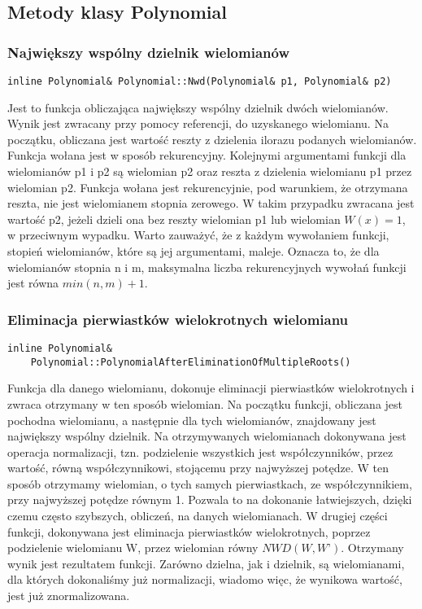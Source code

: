 \documentclass[twoside,a4paper]{book}
\begin{document}
\subsection{Metody klasy Polynomial}

\subsubsection{Największy wspólny dzielnik wielomianów}
\begin{lstlisting}
inline Polynomial& Polynomial::Nwd(Polynomial& p1, Polynomial& p2)
\end{lstlisting}
Jest to funkcja obliczająca największy wspólny dzielnik dwóch wielomianów. Wynik jest zwracany przy pomocy referencji, do uzyskanego wielomianu. Na początku, obliczana jest wartość reszty z dzielenia ilorazu podanych wielomianów. Funkcja wołana jest w sposób rekurencyjny. Kolejnymi argumentami funkcji dla wielomianów p1 i p2 są wielomian p2 oraz reszta z dzielenia wielomianu p1 przez wielomian p2. Funkcja wołana jest rekurencyjnie, pod warunkiem, że otrzymana reszta, nie jest wielomianem stopnia zerowego. W takim przypadku zwracana jest wartość p2, jeżeli dzieli ona bez reszty wielomian p1 lub wielomian $W(x)=1$, w przeciwnym wypadku. Warto zauważyć, że z każdym wywołaniem funkcji, stopień wielomianów, które są jej argumentami, maleje. Oznacza to, że dla wielomianów stopnia n i m, maksymalna liczba rekurencyjnych wywołań funkcji jest równa $min(n,m)+1$.

\subsubsection{Eliminacja pierwiastków wielokrotnych wielomianu}
\begin{lstlisting}
inline Polynomial&
	Polynomial::PolynomialAfterEliminationOfMultipleRoots()
\end{lstlisting}
Funkcja dla danego wielomianu, dokonuje eliminacji pierwiastków wielokrotnych i zwraca otrzymany w ten sposób wielomian. Na początku funkcji, obliczana jest pochodna wielomianu, a następnie dla tych wielomianów, znajdowany jest największy wspólny dzielnik. Na otrzymywanych wielomianach dokonywana jest operacja normalizacji, tzn. podzielenie wszystkich jest współczynników, przez wartość, równą współczynnikowi, stojącemu przy najwyższej potędze. W ten sposób otrzymamy wielomian, o tych samych pierwiastkach, ze współczynnikiem, przy najwyższej potędze równym 1. Pozwala to na dokonanie łatwiejszych, dzięki czemu często szybszych, obliczeń, na danych wielomianach. W drugiej części funkcji, dokonywana jest eliminacja pierwiastków wielokrotnych, poprzez podzielenie wielomianu W, przez wielomian równy $NWD(W, W’)$. Otrzymany wynik jest rezultatem funkcji. Zarówno dzielna, jak i dzielnik, są wielomianami, dla których dokonaliśmy już normalizacji, wiadomo więc, że wynikowa wartość, jest już znormalizowana.
\end{document}
